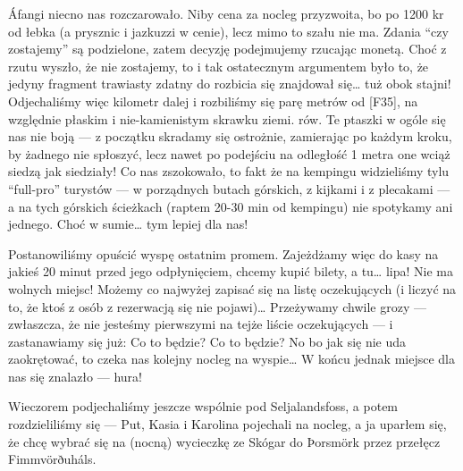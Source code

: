 Áfangi niecno nas rozczarowało. Niby cena za nocleg przyzwoita, bo po 1200 kr od łebka (a prysznic i jazkuzzi w cenie), lecz mimo to szału nie ma. Zdania “czy zostajemy” są podzielone, zatem decyzję podejmujemy rzucając monetą. Choć z rzutu wyszło, że nie zostajemy, to i tak ostatecznym argumentem było to, że jedyny fragment trawiasty zdatny do rozbicia się znajdował się… tuż obok stajni! Odjechaliśmy więc kilometr dalej i rozbiliśmy się parę metrów od [F35], na względnie płaskim i nie-kamienistym skrawku ziemi.
rów. Te ptaszki w ogóle się nas nie boją --- z początku skradamy się ostrożnie, zamierając po każdym kroku, by żadnego nie spłoszyć, lecz nawet po podejściu na odległość 1 metra one wciąż siedzą jak siedziały! Co nas zszokowało, to fakt że na kempingu widzieliśmy tylu “full-pro” turystów --- w porządnych butach górskich, z kijkami i z plecakami --- a na tych górskich ścieżkach (raptem 20-30 min od kempingu) nie spotykamy ani jednego. Choć w sumie… tym lepiej dla nas!


Postanowiliśmy opuścić wyspę ostatnim promem. Zajeżdżamy więc do kasy na jakieś 20 minut przed jego odpłynięciem, chcemy kupić bilety, a tu… lipa! Nie ma wolnych miejsc! Możemy co najwyżej zapisać się na listę oczekujących (i liczyć na to, że ktoś z osób z rezerwacją się nie pojawi)… Przeżywamy chwile grozy --- zwłaszcza, że nie jesteśmy pierwszymi na tejże liście oczekujących --- i zastanawiamy się już: Co to będzie? Co to będzie? No bo jak się nie uda zaokrętować, to czeka nas kolejny nocleg na wyspie… W końcu jednak miejsce dla nas się znalazło --- hura!



Wieczorem podjechaliśmy jeszcze wspólnie pod Seljalandsfoss, a potem rozdzieliliśmy się --- Put, Kasia i Karolina pojechali na nocleg, a ja uparłem się, że chcę wybrać się na (nocną) wycieczkę ze Skógar do Þorsmörk przez przełęcz Fimmvörðuháls.